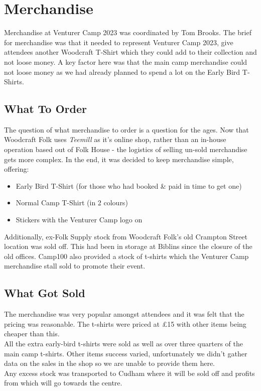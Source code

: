 \chapter{Merchandise}

Merchandise at Venturer Camp 2023 was coordinated by Tom Brooks. The brief for merchandise was that it needed to represent Venturer Camp 2023, give attendees another Woodcraft T-Shirt which they could add to their collection and not loose money. A key factor here was that the main camp merchandise could not loose money as we had already planned to spend a lot on the Early Bird T-Shirts.

\section{What To Order}
The question of what merchandise to order is a question for the ages. Now that Woodcraft Folk uses \textit{Teemill} as it's online shop, rather than an in-house operation based out of Folk House - the logistics of selling un-sold merchandise gets more complex. In the end, it was decided to keep merchandise simple, offering:
\begin{itemize}
    \item Early Bird T-Shirt (for those who had booked \& paid in time to get one)
    \item Normal Camp T-Shirt (in 2 colours)
    \item Stickers with the Venturer Camp logo on
\end{itemize}
Additionally, ex-Folk Supply stock from Woodcraft Folk's old Crampton Street location was sold off. This had been in storage at Biblins since the closure of the old offices. Camp100 also provided a stock of t-shirts which the Venturer Camp merchandise stall sold to promote their event.

\section{What Got Sold}
The merchandise was very popular amongst attendees and it was felt that the pricing was reasonable. The t-shirts were priced at \pounds15 with other items being cheaper than this. \\

All the extra early-bird t-shirts were sold as well as over three quarters of the main camp t-shirts. Other items success varied, unfortunately we didn't gather data on the sales in the shop so we are unable to provide them here. \\

Any excess stock was transported to Cudham where it will be sold off and profits from which will go towards the centre.
